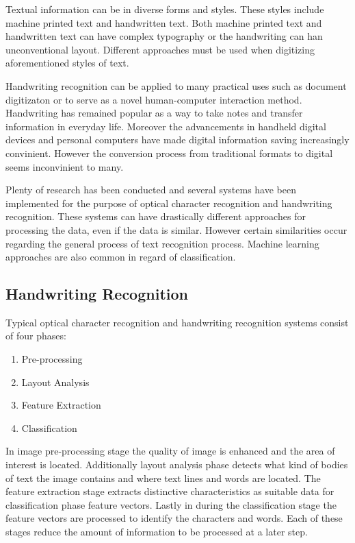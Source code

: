 \documentclass{article}
\begin{document}
    Textual information can be in diverse forms and styles. These styles include machine printed text and handwritten text. Both machine printed text and handwritten text can have complex typography or the handwriting can han unconventional layout. Different approaches must be used when digitizing aforementioned styles of text.

    Handwriting recognition can be applied to many practical uses such as document digitizaton or to serve as a novel human-computer interaction method. Handwriting has remained popular as a way to take notes and transfer information in everyday life. Moreover the advancements in handheld digital devices and personal computers have made digital information saving increasingly convinient. However the conversion process from traditional formats to digital seems inconvinient to many.

    Plenty of research has been conducted and several systems have been implemented for the purpose of optical character recognition and handwriting recognition. These systems can have drastically different approaches for processing the data, even if the data is similar. However certain similarities occur regarding the general process of text recognition process. Machine learning approaches are also common in regard of classification.


  \subsection{Handwriting Recognition}
    Typical optical character recognition and handwriting recognition systems consist of four phases:

    \begin{enumerate}
      \item{Pre-processing}
      \item{Layout Analysis}
      \item{Feature Extraction}
      \item{Classification}
    \end{enumerate}

    In image pre-processing stage the quality of image is enhanced and the area of interest is located. Additionally layout analysis phase detects what kind of bodies of text the image contains and where text lines and words are located. The feature extraction stage extracts distinctive characteristics as suitable data for classification phase feature vectors. Lastly in during the classification stage the feature vectors are processed to identify the characters and words. Each of these stages reduce the amount of information to be processed at a later step. \cite{Cheriet2007}
\end{document}
